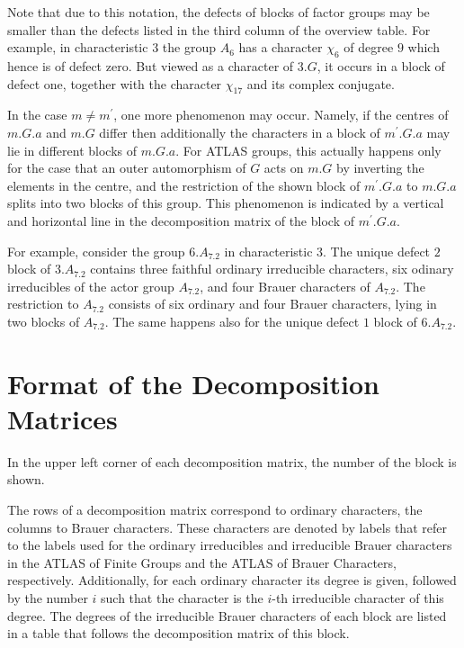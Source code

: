 \documentclass[a4paper]{article}
\def\ATLAS{{\sf ATLAS}}
\begin{document}
Note that due to this notation, the defects of blocks of factor groups
may be smaller than the defects listed in the third column of the
overview table.
For example, in characteristic $3$ the group $A_6$ has a character
$\chi_6$ of degree $9$ which hence is of defect zero.
But viewed as a character of $3.G$, it occurs in a block of defect one,
together with the character $\chi_{17}$ and its complex conjugate.

In the case $m \not= m^{\prime}$, one more phenomenon may occur.
Namely, if the centres of $m.G.a$ and $m.G$ differ then additionally
the characters in a block of $m^{\prime}.G.a$ may lie in different blocks
of $m.G.a$.
For {\ATLAS} groups, this actually happens only for the case that an
outer automorphism of $G$ acts on $m.G$ by inverting the elements in the
centre,
and the restriction of the shown block of $m^{\prime}.G.a$ to $m.G.a$
splits into two blocks of this group.
This phenomenon is indicated by a vertical and horizontal line in the
decomposition matrix of the block of $m^{\prime}.G.a$.

For example, consider the group $6.A_7.2$ in characteristic $3$.
The unique defect $2$ block of $3.A_7.2$ contains three faithful ordinary
irreducible characters, six odinary irreducibles of the actor group
$A_7.2$, and four Brauer characters of $A_7.2$.
The restriction to $A_7.2$ consists of six ordinary and four Brauer
characters, lying in two blocks of $A_7.2$.
The same happens also for the unique defect $1$ block of $6.A_7.2$.


\section{Format of the Decomposition Matrices}

In the upper left corner of each decomposition matrix,
the number of the block is shown.

The rows of a decomposition matrix correspond to ordinary characters,
the columns to Brauer characters.
These characters are denoted by labels
that refer to the labels used for the ordinary irreducibles and
irreducible Brauer characters in the {\ATLAS} of Finite Groups
and the {\ATLAS} of Brauer Characters, respectively.
Additionally, for each ordinary character its degree is given,
followed by the number $i$ such that the character is the $i$-th
irreducible character of this degree.
The degrees of the irreducible Brauer characters of each block are
listed in a table that follows the decomposition matrix of this block.
\end{document}
